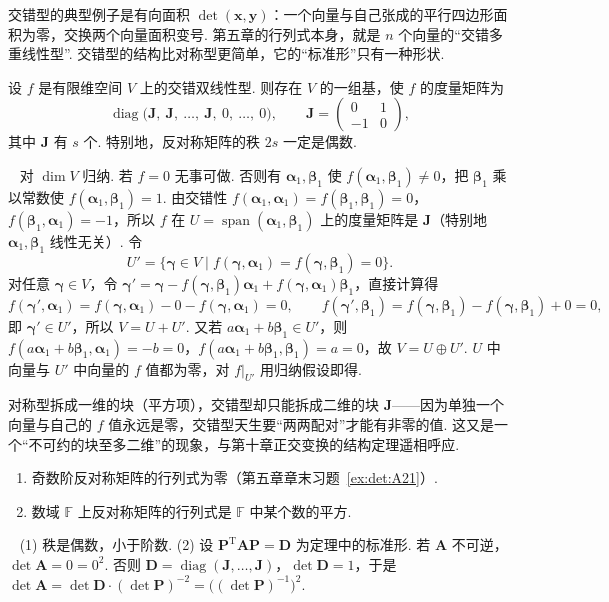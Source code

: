 \documentclass[lang=cn,10.5pt,scheme=chinese,toc=twocol,section,chinesefont=nofont,
twoside,citestyle=gb7714-2015,bibstyle=gb7714-2015]{elegantbook}
\DeclareRobustCommand{\textbf}[1]{{\lnsemiboldlatin\lnsemiboldcjk #1}}
\newcommand{\vv}[1]{\boldsymbol{#1}}
\newcommand{\trans}{\mathrm{T}}             %
\numberwithin{equation}{section}   %
\newcommand{\spn}{\operatorname{span}}      %
\newcommand{\diag}{\operatorname{diag}}
\newcommand*{\lnlabel}[1]{{\sffamily\bfseries\color{black}#1}}
\renewenvironment{proof}{%
	\par\noindent\lnlabel{\proofname}\;\ \color{black!90}\cfs}{\par}
\begin{document}
交错型的典型例子是有向面积 $\det(\vv x,\vv y)$：一个向量与自己张成的平行四边形面积为零，交换两个向量面积变号. 第五章的行列式本身，就是 $n$ 个向量的“交错多重线性型”. 交错型的结构比对称型更简单，它的“标准形”只有一种形状.

\begin{theorem}
  \label{thm:alternating}
  设 $f$ 是有限维空间 $V$ 上的交错双线性型. 则存在 $V$ 的一组基，使 $f$ 的度量矩阵为
  \[\diag\big(\vv J,\ \vv J,\ \ldots,\ \vv J,\ 0,\ \ldots,\ 0\big),\qquad\vv J=
    \begin{pmatrix}
      0 & 1 \\-1&0
    \end{pmatrix}
    ,\]
  其中 $\vv J$ 有 $s$ 个. 特别地，反对称矩阵的秩 $2s$ 一定是\textbf{偶数}.
\end{theorem}
\begin{proof}
  对 $\dim V$ 归纳. 若 $f=0$ 无事可做. 否则有 $\vv\alpha_1,\vv\beta_1$ 使 $f(\vv\alpha_1,\vv\beta_1)\ne0$，把 $\vv\beta_1$ 乘以常数使 $f(\vv\alpha_1,\vv\beta_1)=1$. 由交错性 $f(\vv\alpha_1,\vv\alpha_1)=f(\vv\beta_1,\vv\beta_1)=0$，$f(\vv\beta_1,\vv\alpha_1)=-1$，所以 $f$ 在 $U=\spn(\vv\alpha_1,\vv\beta_1)$ 上的度量矩阵是 $\vv J$（特别地 $\vv\alpha_1,\vv\beta_1$ 线性无关）. 令
  \[U'=\{\vv\gamma\in V\mid f(\vv\gamma,\vv\alpha_1)=f(\vv\gamma,\vv\beta_1)=0\}.\]
  对任意 $\vv\gamma\in V$，令 $\vv\gamma'=\vv\gamma-f(\vv\gamma,\vv\beta_1)\vv\alpha_1+f(\vv\gamma,\vv\alpha_1)\vv\beta_1$，直接计算得
  \[f(\vv\gamma',\vv\alpha_1)=f(\vv\gamma,\vv\alpha_1)-0-f(\vv\gamma,\vv\alpha_1)=0,\qquad f(\vv\gamma',\vv\beta_1)=f(\vv\gamma,\vv\beta_1)-f(\vv\gamma,\vv\beta_1)+0=0,\]
  即 $\vv\gamma'\in U'$，所以 $V=U+U'$. 又若 $a\vv\alpha_1+b\vv\beta_1\in U'$，则 $f(a\vv\alpha_1+b\vv\beta_1,\vv\alpha_1)=-b=0$，$f(a\vv\alpha_1+b\vv\beta_1,\vv\beta_1)=a=0$，故 $V=U\oplus U'$. $U$ 中向量与 $U'$ 中向量的 $f$ 值都为零，对 $f|_{U'}$ 用归纳假设即得.
\end{proof}

\begin{motivebox}
  对称型拆成\textbf{一维}的块（平方项），交错型却只能拆成\textbf{二维}的块 $\vv J$——因为单独一个向量与自己的 $f$ 值永远是零，交错型天生要“两两配对”才能有非零的值. 这又是一个“不可约的块至多二维”的现象，与第十章正交变换的结构定理遥相呼应.
\end{motivebox}

\begin{corollary}
  \label{cor:pfaffian}
  \begin{enumerate}
    \item 奇数阶反对称矩阵的行列式为零（第五章章末习题~\ref{ex:det:A21}）.
    \item 数域 $\mathbb{F}$ 上反对称矩阵的行列式是 $\mathbb{F}$ 中某个数的平方.
  \end{enumerate}
\end{corollary}
\begin{proof}
  (1) 秩是偶数，小于阶数. (2) 设 $\vv P^\trans\vv A\vv P=\vv D$ 为定理中的标准形. 若 $\vv A$ 不可逆，$\det\vv A=0=0^2$. 否则 $\vv D=\diag(\vv J,\ldots,\vv J)$，$\det\vv D=1$，于是 $\det\vv A=\det\vv D\cdot(\det\vv P)^{-2}=\big((\det\vv P)^{-1}\big)^2$.
\end{proof}
\end{document}
